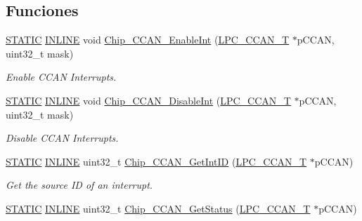 \subsection*{Funciones}
\begin{DoxyCompactItemize}
\item 
\hyperlink{group___l_p_c___types___public___macros_ga10b2d890d871e1489bb02b7e70d9bdfb}{S\+T\+A\+T\+IC} \hyperlink{spifi__18xx__43xx_8h_a2eb6f9e0395b47b8d5e3eeae4fe0c116}{I\+N\+L\+I\+NE} void \hyperlink{group___c_c_a_n__18_x_x__43_x_x_ga06bb34ff1e211fa5153a7f699b9ba599}{Chip\+\_\+\+C\+C\+A\+N\+\_\+\+Enable\+Int} (\hyperlink{struct_l_p_c___c_c_a_n___t}{L\+P\+C\+\_\+\+C\+C\+A\+N\+\_\+T} $\ast$p\+C\+C\+AN, uint32\+\_\+t mask)
\begin{DoxyCompactList}\small\item\em Enable C\+C\+AN Interrupts. \end{DoxyCompactList}\item 
\hyperlink{group___l_p_c___types___public___macros_ga10b2d890d871e1489bb02b7e70d9bdfb}{S\+T\+A\+T\+IC} \hyperlink{spifi__18xx__43xx_8h_a2eb6f9e0395b47b8d5e3eeae4fe0c116}{I\+N\+L\+I\+NE} void \hyperlink{group___c_c_a_n__18_x_x__43_x_x_gaf4667bd6b992eabb841d91e9b6a753be}{Chip\+\_\+\+C\+C\+A\+N\+\_\+\+Disable\+Int} (\hyperlink{struct_l_p_c___c_c_a_n___t}{L\+P\+C\+\_\+\+C\+C\+A\+N\+\_\+T} $\ast$p\+C\+C\+AN, uint32\+\_\+t mask)
\begin{DoxyCompactList}\small\item\em Disable C\+C\+AN Interrupts. \end{DoxyCompactList}\item 
\hyperlink{group___l_p_c___types___public___macros_ga10b2d890d871e1489bb02b7e70d9bdfb}{S\+T\+A\+T\+IC} \hyperlink{spifi__18xx__43xx_8h_a2eb6f9e0395b47b8d5e3eeae4fe0c116}{I\+N\+L\+I\+NE} uint32\+\_\+t \hyperlink{group___c_c_a_n__18_x_x__43_x_x_ga0f994d17cbfb6859384c4f4896a23156}{Chip\+\_\+\+C\+C\+A\+N\+\_\+\+Get\+Int\+ID} (\hyperlink{struct_l_p_c___c_c_a_n___t}{L\+P\+C\+\_\+\+C\+C\+A\+N\+\_\+T} $\ast$p\+C\+C\+AN)
\begin{DoxyCompactList}\small\item\em Get the source ID of an interrupt. \end{DoxyCompactList}\item 
\hyperlink{group___l_p_c___types___public___macros_ga10b2d890d871e1489bb02b7e70d9bdfb}{S\+T\+A\+T\+IC} \hyperlink{spifi__18xx__43xx_8h_a2eb6f9e0395b47b8d5e3eeae4fe0c116}{I\+N\+L\+I\+NE} uint32\+\_\+t \hyperlink{group___c_c_a_n__18_x_x__43_x_x_gac5ea5e28fefe41244766c8cd9b8dce6d}{Chip\+\_\+\+C\+C\+A\+N\+\_\+\+Get\+Status} (\hyperlink{struct_l_p_c___c_c_a_n___t}{L\+P\+C\+\_\+\+C\+C\+A\+N\+\_\+T} $\ast$p\+C\+C\+AN)

\end{DoxyCompactItemize}
